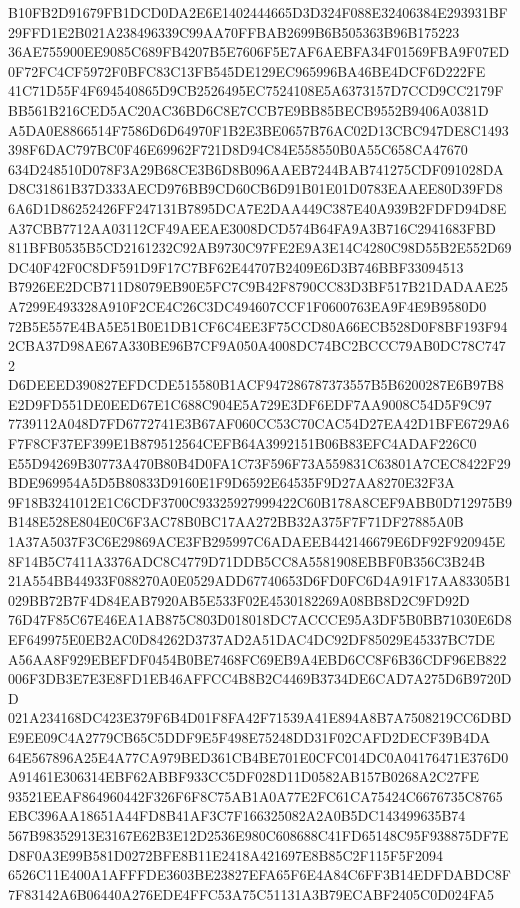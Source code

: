 \documentclass[UTF8,fontset=fandol,zihao=-4,a4paper]{ctexart}
\begin{document}
{{B10FB2D91679FB1DCD0DA2E6E1402444665D3D324F088E32406384E293931BF29FFD1E2B021A238496339C99AA70FFBAB2699B6B505363B96B175223
36AE755900EE9085C689FB4207B5E7606F5E7AF6AEBFA34F01569FBA9F07ED0F72FC4CF5972F0BFC83C13FB545DE129EC965996BA46BE4DCF6D222FE
41C71D55F4F694540865D9CB2526495EC7524108E5A6373157D7CCD9CC2179FBB561B216CED5AC20AC36BD6C8E7CCB7E9BB85BECB9552B9406A0381D
A5DA0E8866514F7586D6D64970F1B2E3BE0657B76AC02D13CBC947DE8C1493398F6DAC797BC0F46E69962F721D8D94C84E558550B0A55C658CA47670
634D248510D078F3A29B68CE3B6D8B096AAEB7244BAB741275CDF091028DAD8C31861B37D333AECD976BB9CD60CB6D91B01E01D0783EAAEE80D39FD8
6A6D1D86252426FF247131B7895DCA7E2DAA449C387E40A939B2FDFD94D8EA37CBB7712AA03112CF49AEEAE3008DCD574B64FA9A3B716C2941683FBD
811BFB0535B5CD2161232C92AB9730C97FE2E9A3E14C4280C98D55B2E552D69DC40F42F0C8DF591D9F17C7BF62E44707B2409E6D3B746BBF33094513
B7926EE2DCB711D8079EB90E5FC7C9B42F8790CC83D3BF517B21DADAAE25A7299E493328A910F2CE4C26C3DC494607CCF1F0600763EA9F4E9B9580D0
72B5E557E4BA5E51B0E1DB1CF6C4EE3F75CCD80A66ECB528D0F8BF193F942CBA37D98AE67A330BE96B7CF9A050A4008DC74BC2BCCC79AB0DC78C7472
D6DEEED390827EFDCDE515580B1ACF947286787373557B5B6200287E6B97B8E2D9FD551DE0EED67E1C688C904E5A729E3DF6EDF7AA9008C54D5F9C97
7739112A048D7FD6772741E3B67AF060CC53C70CAC54D27EA42D1BFE6729A6F7F8CF37EF399E1B879512564CEFB64A3992151B06B83EFC4ADAF226C0
E55D94269B30773A470B80B4D0FA1C73F596F73A559831C63801A7CEC8422F29BDE969954A5D5B80833D9160E1F9D6592E64535F9D27AA8270E32F3A
9F18B3241012E1C6CDF3700C93325927999422C60B178A8CEF9ABB0D712975B9B148E528E804E0C6F3AC78B0BC17AA272BB32A375F7F71DF27885A0B
1A37A5037F3C6E29869ACE3FB295997C6ADAEEB442146679E6DF92F920945E8F14B5C7411A3376ADC8C4779D71DDB5CC8A5581908EBBF0B356C3B24B
21A554BB44933F088270A0E0529ADD67740653D6FD0FC6D4A91F17AA83305B1029BB72B7F4D84EAB7920AB5E533F02E4530182269A08BB8D2C9FD92D
76D47F85C67E46EA1AB875C803D018018DC7ACCCE95A3DF5B0BB71030E6D8EF649975E0EB2AC0D84262D3737AD2A51DAC4DC92DF85029E45337BC7DE
A56AA8F929EBEFDF0454B0BE7468FC69EB9A4EBD6CC8F6B36CDF96EB822006F3DB3E7E3E8FD1EB46AFFCC4B8B2C4469B3734DE6CAD7A275D6B9720DD
021A234168DC423E379F6B4D01F8FA42F71539A41E894A8B7A7508219CC6DBDE9EE09C4A2779CB65C5DDF9E5F498E75248DD31F02CAFD2DECF39B4DA
64E567896A25E4A77CA979BED361CB4BE701E0CFC014DC0A04176471E376D0A91461E306314EBF62ABBF933CC5DF028D11D0582AB157B0268A2C27FE
93521EEAF864960442F326F6F8C75AB1A0A77E2FC61CA75424C6676735C8765EBC396AA18651A44FD8B41AF3C7F166325082A2A0B5DC143499635B74
567B98352913E3167E62B3E12D2536E980C608688C41FD65148C95F938875DF7ED8F0A3E99B581D0272BFE8B11E2418A421697E8B85C2F115F5F2094
6526C11E400A1AFFFDE3603BE23827EFA65F6E4A84C6FF3B14EDFDABDC8F7F83142A6B06440A276EDE4FFC53A75C51131A3B79ECABF2405C0D024FA5
}}
\end{document}

